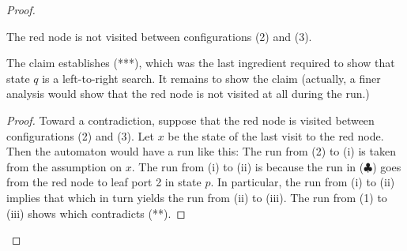 \begin{proof}
\begin{claim}
The red node is not visited between configurations (2) and (3).
\end{claim}
The claim establishes (***), which was the last ingredient required to show that state $q$ is a left-to-right search. It remains to show the claim  (actually, a finer analysis would show that the red node is not visited at all during the run.)  
\begin{proof}
Toward a contradiction, suppose that the red node is visited between configurations (2) and (3). Let $x$ be the state of the last visit to the red node. Then the automaton would have a run like this:
The run from (2) to (i)  is taken from the assumption on $x$. The run from (i) to (ii)  is because the run in ($\clubsuit$) goes from the red node to leaf port 2 in state $p$. In particular, the run from (i) to (ii) implies that 
which in turn yields the run from  (ii) to (iii). The run from (1) to (iii) shows 
 which  contradicts  (**).
\end{proof}
\end{proof}
 
